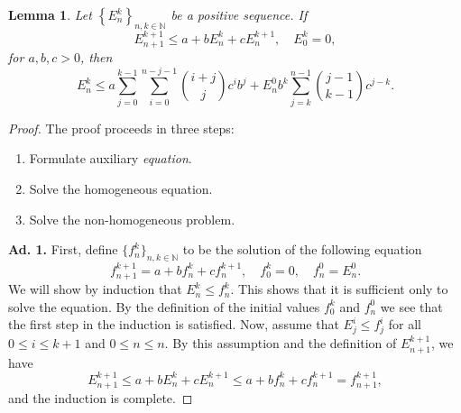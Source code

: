 \documentclass[12pt,a4paper]{article}
\newtheorem{lem}{Lemma}
\begin{document}
\begin{lem}\label{lem:Gronwall}
	Let $\left\{E^k_n\right\}_{n,k \in \mathbb{N}}$ be a positive sequence. If
	\begin{equation}
		E^{k+1}_{n+1} \leq a + b E^k_n + c E^{k+1}_{n}, \quad E^k_0 = 0, 
	\end{equation}
	for $a,b,c > 0$, then
	\begin{equation}\label{eqn:LemmaInequality}
		E^k_n \leq a \sum_{j=0}^{k-1} \sum_{i=0}^{n-j-1} \binom{i+j}{j} c^i b^j + E^0_n b^k \sum_{j=k}^{n-1} \binom{j-1}{k-1} c^{j-k}.
	\end{equation}
\end{lem}
\begin{proof}
	The proof proceeds in three steps:
	\begin{enumerate}
		\item Formulate auxiliary \emph{equation}.
		\item Solve the homogeneous equation.
		\item Solve the non-homogeneous problem.
	\end{enumerate}
	\medskip\noindent\textbf{Ad. 1.} First, define $\{f^k_n\}_{n,k\in\mathbb{N}}$ to be the solution of the following equation
	\begin{equation}
		f^{k+1}_{n+1} = a + b f^k_n + c f^{k+1}_{n}, \quad f^k_0 = 0, \quad f^0_n = E^0_n.
	\end{equation}
	We will show by induction that $E^k_n \leq f^k_n$. This shows that it is sufficient only to solve the equation. By the definition of the initial values $f_0^k$ and $f^0_n$ we see that the first step in the induction is satisfied. Now, assume that $E^i_j \leq f^i_j$ for all $0\leq i \leq k+1$ and $0\leq n \leq n$. By this assumption and the definition of $E^{k+1}_{n+1}$, we have
	\begin{equation}
		E^{k+1}_{n+1} \leq a + b E^k_n + c E^{k+1}_n \leq a + b f^{k}_n + c f^{k+1}_n = f^{k+1}_{n+1}, 
	\end{equation}
	and the induction is complete. 
	

\end{proof}
\end{document}
